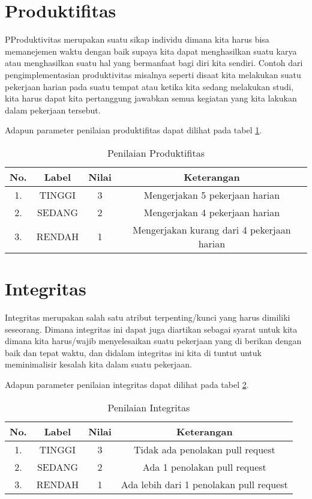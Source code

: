 \section{Produktifitas}
PProduktivitas merupakan suatu sikap individu dimana kita harus bisa memanejemen waktu dengan baik supaya kita dapat menghasilkan suatu karya atau menghasilkan suatu hal yang bermanfaat bagi diri kita sendiri. Contoh dari pengimplementasian produktivitas misalnya seperti disaat kita melakukan suatu pekerjaan harian pada suatu tempat atau ketika kita sedang melakukan studi, kita harus dapat kita pertanggung jawabkan semua kegiatan yang kita lakukan dalam pekerjaan tersebut.

Adapun parameter penilaian produktifitas dapat dilihat pada tabel \ref{table:nilaiproduktifitas}.

\begin{table}[H]
\caption{Penilaian Produktifitas}
\centering
\begin{tabular}{|c|c|c|c|}
\hline
\textbf{No.}&\textbf{Label}&\textbf{Nilai}&\textbf{Keterangan}\\
\hline
1.&TINGGI&3&Mengerjakan 5 pekerjaan harian\\
\hline
2.&SEDANG&2&Mengerjakan 4 pekerjaan harian\\
\hline
3.&RENDAH&1&Mengerjakan kurang dari 4 pekerjaan harian\\
\hline
\end{tabular}
\label{table:nilaiproduktifitas}
\end{table}

\section{Integritas}
Integritas merupakan salah satu atribut terpenting/kunci yang harus dimiliki seseorang. Dimana integritas ini dapat juga diartikan sebagai syarat untuk kita dimana kita harus/wajib menyelesaikan suatu pekerjaan yang di berikan dengan baik dan tepat waktu, dan didalam integritas ini kita di tuntut untuk meminimalisir kesalah kita dalam suatu pekerjaan.

Adapun parameter penilaian integritas dapat dilihat pada tabel \ref{table:nilaiintegritas}.

\begin{table}[H]
\caption{Penilaian Integritas}
\centering
\begin{tabular}{|c|c|c|c|}
\hline
\textbf{No.}&\textbf{Label}&\textbf{Nilai}&\textbf{Keterangan}\\
\hline
1.&TINGGI&3&Tidak ada penolakan pull request\\
\hline
2.&SEDANG&2&Ada 1 penolakan pull request\\
\hline
3.&RENDAH&1&Ada lebih dari 1 penolakan pull request\\
\hline
\end{tabular}
\label{table:nilaiintegritas}
\end{table}

